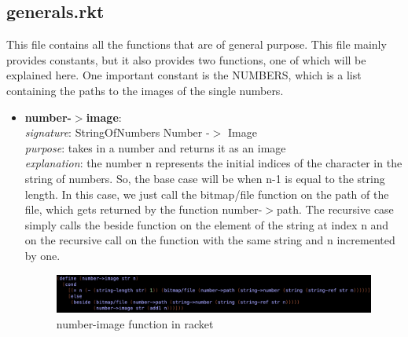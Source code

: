 \documentclass{article}
\begin{document}
	\subsection{generals.rkt}
	This file contains all the functions that are of general purpose. This file mainly provides constants, but it also provides two functions, one of which will be explained here. One important constant is the NUMBERS, which is a list containing the paths to the images of the single numbers.
	\begin{itemize}
		\item \textbf{number-$>$image}: \\
			\emph{signature}: StringOfNumbers Number -$>$ Image \\
			\emph{purpose}: takes in a number and returns it as an image \\
			\emph{explanation}: the number n represents the initial indices of the character in the string of numbers. So, the base case will be when n-1 is equal to the string length. In this case, we just call the bitmap/file function on the path of the file, which gets returned by the function number-$>$path. The recursive case simply calls the beside function on the element of the string at index n and on the recursive call on the function with the same string and n incremented by one.
			\begin{figure}[h!]
				\centering
				\includegraphics[width=.6\linewidth]{number-image.png}
				\caption{number-image function in racket}
			\end{figure}
	\end{itemize}
	
	\pagebreak
	
\end{document}
